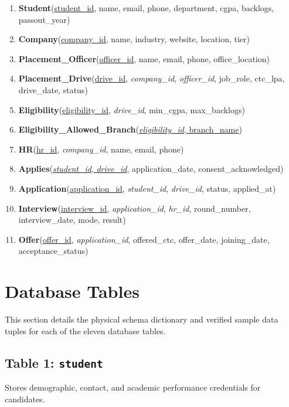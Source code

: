 \documentclass[11pt,a4paper]{article}
\begin{document}
\begin{enumerate}[label=\textbf{\arabic*.}]
    \item \textbf{Student}(\underline{student\_id}, name, email, phone, department, cgpa, backlogs, passout\_year)
    \item \textbf{Company}(\underline{company\_id}, name, industry, website, location, tier)
    \item \textbf{Placement\_Officer}(\underline{officer\_id}, name, email, phone, office\_location)
    \item \textbf{Placement\_Drive}(\underline{drive\_id}, \textit{company\_id}, \textit{officer\_id}, job\_role, ctc\_lpa, drive\_date, status)
    \item \textbf{Eligibility}(\underline{eligibility\_id}, \textit{drive\_id}, min\_cgpa, max\_backlogs)
    \item \textbf{Eligibility\_Allowed\_Branch}(\underline{\textit{eligibility\_id}, branch\_name})
    \item \textbf{HR}(\underline{hr\_id}, \textit{company\_id}, name, email, phone)
    \item \textbf{Applies}(\underline{\textit{student\_id}, \textit{drive\_id}}, application\_date, consent\_acknowledged)
    \item \textbf{Application}(\underline{application\_id}, \textit{student\_id}, \textit{drive\_id}, status, applied\_at)
    \item \textbf{Interview}(\underline{interview\_id}, \textit{application\_id}, \textit{hr\_id}, round\_number, interview\_date, mode, result)
    \item \textbf{Offer}(\underline{offer\_id}, \textit{application\_id}, offered\_ctc, offer\_date, joining\_date, acceptance\_status)
\end{enumerate}

\section{Database Tables}
\label{sec:database_tables}

This section details the physical schema dictionary and verified sample data tuples for each of the eleven database tables.

\subsection{Table 1: \texttt{student}}
Stores demographic, contact, and academic performance credentials for candidates.
\end{document}
